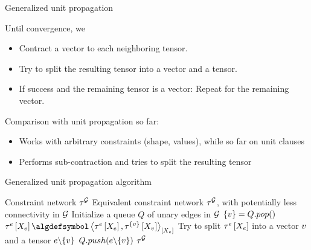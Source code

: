 \documentclass{beamer}
\begin{document}
    \begin{frame}{Generalized unit propagation}

        Until convergence, we
        \begin{itemize}
            \item Contract a vector to each neighboring tensor.
            \item Try to split the resulting tensor into a vector and a tensor.
            \item If success and the remaining tensor is a vector: Repeat for the remaining vector.
        \end{itemize}
        \medskip
        Comparison with unit propagation so far:
        \begin{itemize}
            \item Works with arbitrary constraints (shape, values), while so far on unit clauses
            \item Performs sub-contraction and tries to split the resulting tensor
        \end{itemize}


    \end{frame}

    \begin{frame}{Generalized unit propagation algorithm}

        \begin{algorithm}[H]
            \begin{algorithmic}
                \Require Constraint network $\tau^{\mathcal{G}}$
                \Ensure Equivalent constraint network $\tau^{\mathcal{G}}$, with potentially less connectivity in $\mathcal{G}$
                \iosepline
                \State Initialize a queue $Q$ of unary edges in $\mathcal{G}$
                    \State $\{v\}=Q.pop()$
                    \For{$\edge\in\edges\wcols \node\in\edge$}
                        \State $\hypercoreofat{\edge}{\catvariableof{\edge}}
                        \algdefsymbol \contractionof{\hypercoreofat{\edge}{\catvariableof{\edge}},\hypercoreofat{\{\node\}}{\catvariableof{\node}}}{\catvariableof{\edge}}$
                        \State Try to split $\tau^{e}\left[X_{e}\right]$ into a vector $v$ and a tensor $e\backslash\{v\}$
                            \State $Q.push(e\backslash\{v\})$
                        \EndIf
                    \EndFor
                \EndWhile
                \State \Return $\tau^{\mathcal{G}}$
            \end{algorithmic}
        \end{algorithm}

    \end{frame}
\end{document}
